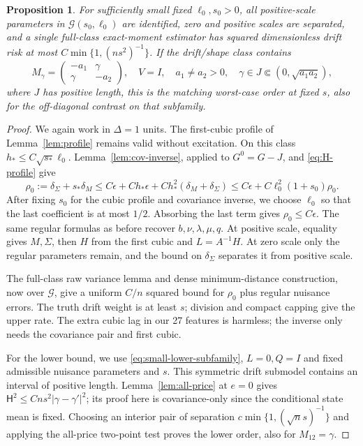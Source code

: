 \documentclass[11pt,a4paper]{amsart}
\theoremstyle{plain}
\newtheorem{proposition}[theorem]{Proposition}
\theoremstyle{definition}
\theoremstyle{remark}
\newcommand{\Hell}{\mathsf H}
\begin{document}
\begin{proposition}\label{prop:small-leverage}
For sufficiently small fixed $\ell_0,s_0>0$, all positive-scale parameters
in $\mathcal G(s_0,\ell_0)$ are identified, zero and positive scales are
separated, and a single full-class exact-moment estimator has squared
dimensionless drift risk at most
$C\min\{1,(ns^2)^{-1}\}$. If the drift/shape class contains
\begin{equation}\label{eq:small-lower-subfamily}
 M_\gamma=\begin{pmatrix}-a_1&\gamma\\\gamma&-a_2\end{pmatrix},\quad
 V=I,\quad a_1\ne a_2>0,\quad
 \gamma\in J\Subset(0,\sqrt{a_1a_2}),
\end{equation}
where $J$ has positive length, this is the matching worst-case order at
fixed $s$, also for the off-diagonal contrast on that subfamily.
\end{proposition}
\begin{proof}
We again work in $\Delta=1$ units. The first-cubic profile of
Lemma~\ref{lem:profile} remains valid without excitation. On this class
$h_*\le C\sqrt{s_*}\ell_0$. Lemma~\ref{lem:cov-inverse}, applied to
$G^0=G-J$, and \eqref{eq:H-profile} give
\[
 \rho_0:=\delta_\Sigma+s_*\delta_M
 \le C\epsilon+C h_*\epsilon
                  +Ch_*^2(\delta_M+\delta_\Sigma)
 \le C\epsilon+C\ell_0^2(1+s_0)\rho_0.
\]
After fixing $s_0$ for the cubic profile and covariance inverse, we choose
$\ell_0$ so that the last coefficient is at most $1/2$. Absorbing the last
term gives $\rho_0\le C\epsilon$. The same regular formulas as before
recover $b,\nu,\lambda,\mu,q$. At positive scale, equality gives $M,\Sigma$, then
$H$ from the first cubic and $L=A^{-1}H$. At zero scale only the regular
parameters remain, and the bound on $\delta_\Sigma$ separates it from
positive scale.

The full-class raw variance lemma and dense minimum-distance construction,
now over $\mathcal G$, give a uniform $C/n$ squared bound for $\rho_0$
plus regular nuisance errors. The truth drift weight is at least $s$;
division and compact capping give the upper rate. The extra cubic lag in
our 27 features is harmless; the inverse only needs the covariance pair
and first cubic.

For the lower bound, we use \eqref{eq:small-lower-subfamily}, $L=0,Q=I$ and
fixed admissible nuisance parameters and $s$. This symmetric drift submodel
contains an interval of positive length. Lemma~\ref{lem:all-price}
at $e=0$ gives $\Hell^2\le Cns^2|\gamma-\gamma'|^2$;
its proof here is covariance-only since the conditional state mean is
fixed. Choosing an interior pair of separation
$c\min\{1,(\sqrt n s)^{-1}\}$ and applying the all-price two-point test
proves the lower order, also for $M_{12}=\gamma$.
\end{proof}
\end{document}
